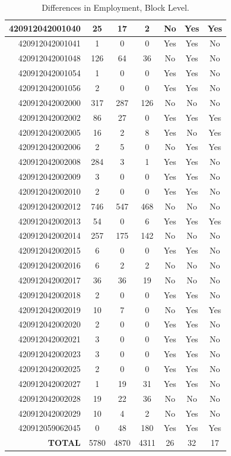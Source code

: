 \documentclass[paper = letter, fontsize = 11pt]{scrartcl}
\begin{document}
\begin{table}
\begin{center}
\begin{tabular}{ r | c c c c c c }
			\hline 
			420912042001040 & 25 & 17 & 2 & No & Yes & Yes\\
			\hline 
			420912042001041 & 1 & 0 & 0 & Yes & Yes & No\\
			\hline 
			420912042001048 & 126 & 64 & 36 & No & Yes & No\\
			\hline 
			420912042001054 & 1 & 0 & 0 & Yes & Yes & No\\
			\hline 
			420912042001056 & 2 & 0 & 0 & Yes & Yes & No\\
			\hline 
			420912042002000 & 317 & 287 & 126 & No & No & No\\
			\hline 
			420912042002002 & 86 & 27 & 0 & Yes & Yes & Yes\\
			\hline 
			420912042002005 & 16 & 2 & 8 & Yes & No & Yes\\
			\hline 
			420912042002006 & 2 & 5 & 0 & No & Yes & Yes\\
			\hline 
			420912042002008 & 284 & 3 & 1 & Yes & Yes & No\\
			\hline 
			420912042002009 & 3 & 0 & 0 & Yes & Yes & No\\
			\hline 
			420912042002010 & 2 & 0 & 0 & Yes & Yes & No\\
			\hline 
			420912042002012 & 746 & 547 & 468 & No & No & No\\
			\hline 
			420912042002013 & 54 & 0 & 6 & Yes & Yes & Yes\\
			\hline 
			420912042002014 & 257 & 175 & 142 & No & No & No\\
			\hline 
			420912042002015 & 6 & 0 & 0 & Yes & Yes & No\\
			\hline 
			420912042002016 & 6 & 2 & 2 & No & No & No\\
			\hline 
			420912042002017 & 36 & 36 & 19 & No & No & No\\
			\hline 
			420912042002018 & 2 & 0 & 0 & Yes & Yes & No\\
			\hline 
			420912042002019 & 10 & 7 & 0 & No & Yes & Yes\\
			\hline 
			420912042002020 & 2 & 0 & 0 & Yes & Yes & No\\
			\hline 
			420912042002021 & 3 & 0 & 0 & Yes & Yes & No\\
			\hline 
			420912042002023 & 3 & 0 & 0 & Yes & Yes & No\\
			\hline 
			420912042002025 & 2 & 0 & 0 & Yes & Yes & No\\
			\hline 
			420912042002027 & 1 & 19 & 31 & Yes & Yes & No\\
			\hline 
			420912042002028 & 19 & 22 & 36 & No & No & No\\
			\hline 
			420912042002029 & 10 & 4 & 2 & No & Yes & No\\
			\hline 
			420912059062045 & 0 & 48 & 180 & Yes & Yes & Yes\\
			\hline
			\hline
			\textbf{TOTAL} & 5780 & 4870 & 4311 & 26 & 32 & 17\\
			\hline
		\end{tabular}
	\end{center}
\caption{Differences in Employment, Block Level.}
\end{table}
\end{document}
